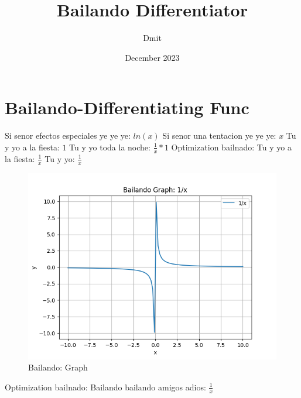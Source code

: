 \documentclass{article}
\title{Bailando Differentiator}
\author{Dmit}
\date{December 2023}
\begin{document}
 
\maketitle 
\section{Bailando-Differentiating Func} 
Si senor efectos especiales ye ye ye: $ln(x)$  \newline Si senor una tentacion ye ye ye: $x$ Tu y yo a la fiesta: $1$  \newline Tu y yo toda la noche: $\frac{1}{x}*1$  \newline \newline Optimization bailnado: \newline Tu y yo a la fiesta: $\frac{1}{x}$  \newline Tu y yo: $\frac{1}{x}$  \newline \begin{figure}
\centering
\includegraphics[width=0.8\linewidth]{Bailando Graph.png}
\caption{Bailando: Graph}
\label{fig:my_image}
\end{figure}
 \newline \newline Optimization bailnado: \newline Bailando bailando amigos adios: $\frac{1}{x}$  \newline 
\end{document}
